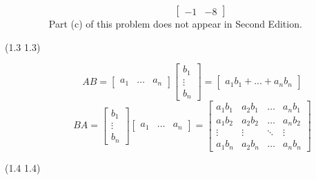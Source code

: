 \begin{description}
\begin{itemize}
$$\begin{bmatrix}
-1 & -8
\end{bmatrix}$$
{\color{cBlue} Part (c) of this problem does not appear in Second Edition.}
\end{itemize}
\item[(1.3 {\color{cBlue}1.3})]
{\color{cBlue}\textbullet}
$$AB = \begin{bmatrix}
a_1 & \hdots & a_n
\end{bmatrix}\begin{bmatrix}
b_1 \\
\vdots \\
b_n
\end{bmatrix} = \begin{bmatrix}
a_1b_1 + ... + a_nb_n
\end{bmatrix}$$
$$BA = \begin{bmatrix}
b_1 \\
\vdots \\
b_n
\end{bmatrix}\begin{bmatrix}
a_1 & \hdots & a_n
\end{bmatrix} = \begin{bmatrix}
a_1b_1 & a_2b_1 & \hdots & a_nb_1 \\
a_1b_2 & a_2b_2 & \hdots & a_nb_2 \\
\vdots & \vdots & \ddots & \vdots \\
a_1b_n & a_2b_n & \hdots & a_nb_n
\end{bmatrix}$$
\item[(1.4 {\color{cBlue}1.4})]

\end{description}
